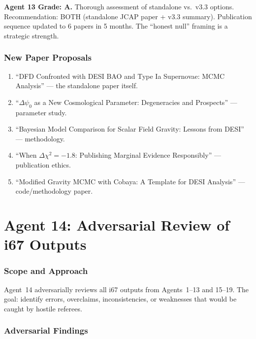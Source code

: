 \documentclass[11pt,a4paper]{article}
\begin{document}
\begin{tcolorbox}[colback=green!5!white,colframe=green!40!black]
\textbf{Agent 13 Grade: A.} Thorough assessment of standalone vs.\ v3.3 options. Recommendation: BOTH (standalone JCAP paper + v3.3 summary). Publication sequence updated to 6 papers in 5 months. The ``honest null'' framing is a strategic strength.
\end{tcolorbox}

\section{New Paper Proposals}

\begin{enumerate}
\item ``DFD Confronted with DESI BAO and Type Ia Supernovae: MCMC Analysis'' --- the standalone paper itself.
\item ``$\Delta\psi_0$ as a New Cosmological Parameter: Degeneracies and Prospects'' --- parameter study.
\item ``Bayesian Model Comparison for Scalar Field Gravity: Lessons from DESI'' --- methodology.
\item ``When $\Delta\chi^2 = -1.8$: Publishing Marginal Evidence Responsibly'' --- publication ethics.
\item ``Modified Gravity MCMC with Cobaya: A Template for DESI Analysis'' --- code/methodology paper.
\end{enumerate}


\part{Agent 14: Adversarial Review of i67 Outputs}
\label{part:adversarial}

\section{Scope and Approach}

Agent~14 adversarially reviews all i67 outputs from Agents~1--13 and 15--19. The goal: identify errors, overclaims, inconsistencies, or weaknesses that would be caught by hostile referees.

\section{Adversarial Findings}
\end{document}
